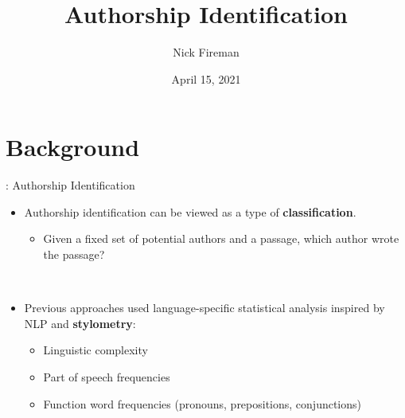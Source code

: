 \documentclass{beamer}
\title[] %
{Authorship Identification}
\author[]{Nick Fireman}
\date{April 15, 2021}
\begin{document}
\frame{\titlepage}

\section{Background}

\begin{frame}{\secname: Authorship Identification}
\begin{itemize}
\item 
Authorship identification can be viewed as a type of \textbf{classification}.
    \begin{itemize}
    \item 
    Given a fixed set of potential authors and a passage, which author wrote the passage?
    \end{itemize}

~\\

\item
Previous approaches used language-specific statistical analysis inspired by NLP and \textbf{stylometry}:
\begin{itemize}
    \item Linguistic complexity
    \item Part of speech frequencies
    \item Function word frequencies (pronouns, prepositions, conjunctions) %
\end{itemize}

\end{itemize}
\end{frame}
\end{document}
